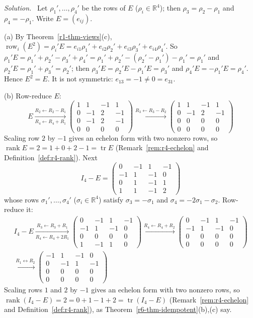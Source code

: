 \documentclass[12pt]{article}
\newcommand{\R}{\mathbb R}
\DeclareMathOperator{\tr}{tr}
\DeclareMathOperator{\row}{row}
\DeclareMathOperator{\rank}{rank}
\theoremstyle{definition}
\newenvironment{solution}{\par\noindent\textit{Solution.}\ }{\par\smallskip}
\begin{document}
\begin{solution}
Let \(\rho_1',\dots,\rho_4'\) be the rows of \(E\) (\(\rho_i\in\R^4\)); then \(\rho_3=\rho_2-\rho_1\) and \(\rho_4=-\rho_1\). Write \(E=(e_{ij})\).

(a) By Theorem~\ref{r1-thm-views}(c), \(\row_i(E^2)=\rho_i'E=e_{i1}\rho_1'+e_{i2}\rho_2'+e_{i3}\rho_3'+e_{i4}\rho_4'\). So
\(\rho_1'E=\rho_1'+\rho_2'-\rho_3'+\rho_4'=\rho_1'+\rho_2'-(\rho_2'-\rho_1')-\rho_1'=\rho_1'\) and
\(\rho_2'E=\rho_1'+\rho_3'=\rho_2'\); then \(\rho_3'E=\rho_2'E-\rho_1'E=\rho_3'\) and \(\rho_4'E=-\rho_1'E=\rho_4'\). Hence
\(E^2=E\). It is not symmetric: \(e_{13}=-1\ne0=e_{31}\).

(b) Row-reduce \(E\):
\[
E\xrightarrow[R_4\leftarrow R_4+R_1]{R_2\leftarrow R_2-R_1}
\begin{pmatrix}1&1&-1&1\\0&-1&2&-1\\0&-1&2&-1\\0&0&0&0\end{pmatrix}
\xrightarrow{R_3\leftarrow R_3-R_2}
\begin{pmatrix}1&1&-1&1\\0&-1&2&-1\\0&0&0&0\\0&0&0&0\end{pmatrix}
\]
Scaling row \(2\) by \(-1\) gives an echelon form with two nonzero rows, so \(\rank E=2=1+0+2-1=\tr E\)
(Remark~\ref{rem:r4-echelon} and Definition~\ref{def:r4-rank}). Next
\[
I_4-E=\begin{pmatrix}0&-1&1&-1\\-1&1&-1&0\\0&1&-1&1\\1&1&-1&2\end{pmatrix}
\]
whose rows \(\sigma_1',\dots,\sigma_4'\) (\(\sigma_i\in\R^4\)) satisfy \(\sigma_3=-\sigma_1\) and \(\sigma_4=-2\sigma_1-\sigma_2\).
Row-reduce it:
\[
\begin{gathered}
I_4-E\xrightarrow[R_4\leftarrow R_4+2R_1]{R_3\leftarrow R_3+R_1}
\begin{pmatrix}0&-1&1&-1\\-1&1&-1&0\\0&0&0&0\\1&-1&1&0\end{pmatrix}
\xrightarrow{R_4\leftarrow R_4+R_2}
\begin{pmatrix}0&-1&1&-1\\-1&1&-1&0\\0&0&0&0\\0&0&0&0\end{pmatrix}
\\
\xrightarrow{R_1\leftrightarrow R_2}
\begin{pmatrix}-1&1&-1&0\\0&-1&1&-1\\0&0&0&0\\0&0&0&0\end{pmatrix}
\end{gathered}
\]
Scaling rows \(1\) and \(2\) by \(-1\) gives an echelon form with two nonzero rows, so
\(\rank(I_4-E)=2=0+1-1+2=\tr(I_4-E)\) (Remark~\ref{rem:r4-echelon} and Definition~\ref{def:r4-rank}), as Theorem~\ref{r6-thm-idempotent}(b),(c) say.


\end{solution}
\end{document}
